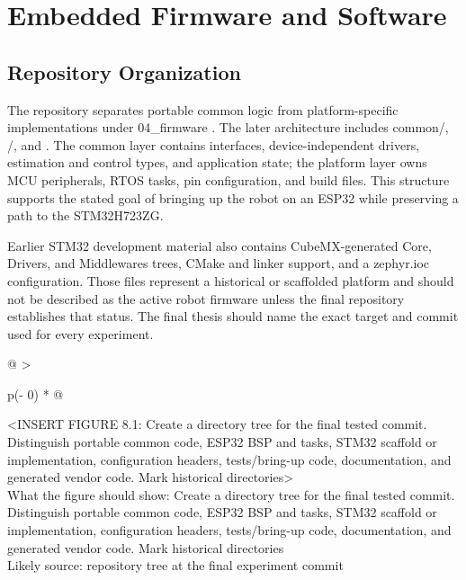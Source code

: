 \chapter{Embedded Firmware and Software}\label{ch:embedded-firmware-and-software}

\section{Repository Organization}\label{repository-organization}

The repository separates portable common logic from platform-specific
implementations under 04\_firmware \cite{zephyr_repo}. The later architecture
includes common/, /, and . The common
layer contains interfaces, device-independent drivers, estimation and
control types, and application state; the platform layer owns MCU
peripherals, RTOS tasks, pin configuration, and build files. This
structure supports the stated goal of bringing up the robot on an ESP32
while preserving a path to the STM32H723ZG.

Earlier STM32 development material also contains CubeMX-generated Core,
Drivers, and Middlewares trees, CMake and linker support, and a
zephyr.ioc configuration. Those files represent a historical or
scaffolded platform and should not be described as the active robot
firmware unless the final repository establishes that status. The final
thesis should name the exact target and commit used for every
experiment.

\begin{longtable}[]{@{}
  >{\raggedright\arraybackslash}p{(\columnwidth - 0\tabcolsep) * }@{}}
\toprule\noalign{}
\begin{minipage}[b]{\linewidth}\raggedright
\textless INSERT FIGURE 8.1: Create a directory tree for the final
tested commit. Distinguish portable common code, ESP32 BSP and tasks,
STM32 scaffold or implementation, configuration headers, tests\slash{}bring-up
code, documentation, and generated vendor code. Mark historical
directories\textgreater{}\\
What the figure should show: Create a directory tree for the final
tested commit. Distinguish portable common code, ESP32 BSP and tasks,
STM32 scaffold or implementation, configuration headers, tests\slash{}bring-up
code, documentation, and generated vendor code. Mark historical
directories\\
Likely source: repository tree at the final experiment commit\strut
\end{minipage} \\
\midrule\noalign{}
\endhead
\bottomrule\noalign{}
\endlastfoot
\end{longtable}

